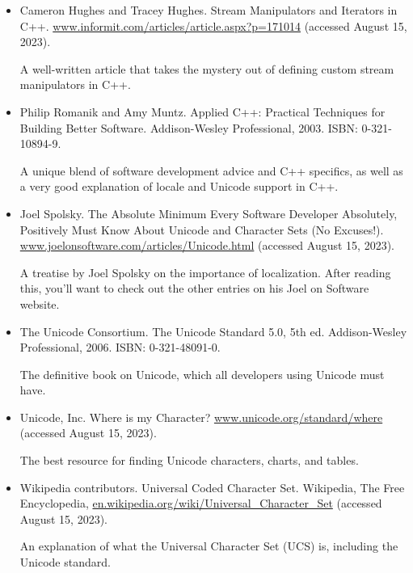 \begin{itemize}
\item
Cameron Hughes and Tracey Hughes. Stream Manipulators and Iterators in C++. \url{www.informit.com/articles/article.aspx?p=171014} (accessed August 15, 2023).

A well-written article that takes the mystery out of defining custom stream manipulators in C++.

\item
Philip Romanik and Amy Muntz. Applied C++: Practical Techniques for Building Better Software. Addison-Wesley Professional, 2003. ISBN: 0-321-10894-9.

A unique blend of software development advice and C++ specifics, as well as a very good explanation of locale and Unicode support in C++.

\item
Joel Spolsky. The Absolute Minimum Every Software Developer Absolutely, Positively Must Know About Unicode and Character Sets (No Excuses!). \url{www.joelonsoftware.com/articles/Unicode.html} (accessed August 15, 2023).

A treatise by Joel Spolsky on the importance of localization. After reading this, you’ll want to check out the other entries on his Joel on Software website.

\item
The Unicode Consortium. The Unicode Standard 5.0, 5th ed. Addison-Wesley Professional, 2006. ISBN: 0-321-48091-0.

The definitive book on Unicode, which all developers using Unicode must have.

\item
Unicode, Inc. Where is my Character? \url{www.unicode.org/standard/where} (accessed August 15, 2023).

The best resource for finding Unicode characters, charts, and tables.

\item
Wikipedia contributors. Universal Coded Character Set. Wikipedia, The Free Encyclopedia, \url{en.wikipedia.org/wiki/Universal_Character_Set} (accessed August 15, 2023).

An explanation of what the Universal Character Set (UCS) is, including the Unicode standard.
\end{itemize}


